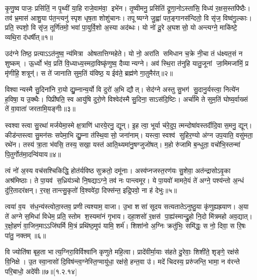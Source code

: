 कृ॒णु॒ष्व पाजः॒ प्रसि॑तिं॒ न पृ॒थ्वीं या॒हि राजे॒वाम॑वा॒ इभे॑न। तृ॒ष्वीमनु॒ प्रसि॑तिं द्रूणा॒नोऽस्ता॑सि॒ विध्य॑ र॒क्षस॒स्तपि॑ष्ठैः। तव॑ भ्र॒मास॑ आशु॒या प॑त॒न्त्यनु॑ स्पृश धृष॒ता शोशु॑चानः। तपूष्यग्ने जु॒ह्वा॑ पत॒ङ्गानस॑न्दितो॒ वि सृ॑ज॒ विष्व॑गु॒ल्काः। प्रति॒ स्पशो॒ वि सृ॑ज॒ तूर्णि॑तमो॒ भवा॑ पा॒युर्वि॒शो अ॒स्या अद॑ब्धः। यो नो॑ दू॒रे अ॒घशसो॒  यो अन्त्यग्ने॒ माकि॑ष्टे॒ व्यथि॒रा द॑धर्षीत्॥१॥

उद॑ग्ने तिष्ठ॒ प्रत्याऽऽत॑नुष्व॒ न्य॑मित्रा ओषतात्तिग्महेते। यो नो॒ अरा॑ति समिधान च॒क्रे नी॒चा तं ध॑क्ष्यत॒सं न शुष्कम्। ऊ॒र्ध्वो भ॑व॒ प्रति॑ वि॒ध्याध्य॒स्मदा॒विष्कृ॑णुष्व॒ दैव्यान्यग्ने। अव॑ स्थि॒रा त॑नुहि यातु॒जूनां जा॒मिमजा॑मिं॒ प्र मृ॑णीहि॒ शत्रून्॑। स ते॑ जानाति सुम॒तिं य॑विष्ठ॒ य ईव॑ते॒ ब्रह्म॑णे गा॒तुमैर॑त्॥२॥

 विश्वान्यस्मै सु॒दिना॑नि रा॒यो द्यु॒म्नान्य॒र्यो वि दुरो॑ अ॒भि द्यौत्। सेद॑ग्ने अस्तु सु॒भग॑ सु॒दानु॒र्यस्त्वा॒ नित्ये॑न ह॒विषा॒ य उ॒क्थैः। पिप्री॑षति॒ स्व आयु॑षि दुरो॒णे विश्वेद॑स्मै सु॒दिना॒ साऽस॑दि॒ष्टिः। अर्चा॑मि ते सुम॒तिं घोष्य॒र्वाख्सं ते॑ वा॒वाता॑ जरतामि॒यङ्गीः॥३॥
 
स्वश्वास्त्वा सु॒रथा॑ मर्जयेमा॒स्मे क्ष॒त्राणि॑ धारये॒रनु॒ द्यून्। इ॒ह त्वा॒ भूर्या च॑रे॒दुप॒ त्मन्दोषा॑\-वस्तर्दीदि॒वा\-स॒मनु॒ द्यून्। कीड॑न्तस्त्वा सु॒मन॑सः सपेमा॒भि द्यु॒म्ना त॑स्थि॒वासो॒ जना॑नाम्। यस्त्वा॒ स्वश्व॑ सुहिर॒ण्यो अ॑ग्न उप॒याति॒ वसु॑मता॒ रथे॑न। तस्य॑ त्रा॒ता भ॑वसि॒ तस्य॒ सखा॒ यस्त॑ आति॒थ्यमा॑नु॒षग्जुजो॑षत्। म॒हो रु॑जामि ब॒न्धुता॒ वचो॑भि॒स्तन्मा॑ पि॒तुर्गोत॑मा॒दन्वि॑याय॥४॥

 त्वं नो॑ अ॒स्य वच॑सश्चिकिद्धि॒ होत॑र्यविष्ठ सुक्रतो॒ दमू॑नाः। अस्व॑प्नजस्त॒रण॑यः सु॒शेवा॒ अत॑न्द्रासोऽवृ॒का अश्र॑मिष्ठाः। ते पा॒यव॑ स॒ध्रिय॑ञ्चो नि॒षद्याऽग्ने॒ तव॑ नः पान्त्वमूर। ये पा॒यवो॑ मामते॒यं ते॑ अग्ने॒ पश्य॑न्तो अ॒न्धं दु॑रि॒तादर॑क्षन्। र॒रक्ष॒ तान्त्सु॒कृतो॑ वि॒श्ववे॑दा॒ दिफ्स॑न्त॒ इद्रि॒पवो॒ ना ह॑ देभुः॥५॥
 
त्वया॑ व॒य स॑ध॒न्य॑स्त्वोता॒स्तव॒ प्रणीत्यश्याम॒ वाजा\sn{}। उ॒भा शसा॑ सूदय सत्यतातेऽनुष्ठु॒या कृ॑णुह्यह्रयाण। अ॒या ते॑ अग्ने स॒मिधा॑ विधेम॒ प्रति॒ स्तोम श॒स्यमा॑नं गृभाय। दहा॒\aav{}शसो॑ र॒क्षस॑ पा॒ह्य॑स्मान्द्रु॒हो नि॒दो मि॑त्रमहो अव॒द्यात्। र॒क्षो॒हणं॑ वा॒जिन॒माऽऽजि॑घर्मि मि॒त्रं प्रथि॑ष्ठ॒मुप॑ यामि॒ शर्म॑। शिशा॑नो अ॒ग्निः क्रतु॑भिः॒ समि॑द्धः॒ स नो॒ दिवा॒ स रि॒षः पा॑तु॒ नक्तम्॥६॥

 वि ज्योति॑षा बृह॒ता भात्य॒ग्निरा॒विर्विश्वा॑नि कृणुते महि॒त्वा। प्रादे॑वीर्मा॒याः स॑हते दु॒रेवाः॒ शिशी॑ते॒ शृङ्गे॒ रक्ष॑से वि॒निक्षे। उ॒त स्वा॒नासो॑ दि॒विष॑न्त्व॒ग्नेस्ति॒ग्मायु॑धा॒ रक्ष॑से॒ हन्त॒वा उ॑। मदे॑ चिदस्य॒ प्ररु॑जन्ति॒ भामा॒ न व॑रन्ते परि॒बाधो॒ अदे॑वीः॥७॥[१.२.१४]

